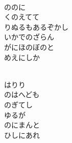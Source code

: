 \documentclass[10pt,b5j]{tarticle} %
\begin{document}
\begin{enumerate}
\begin{minipage}[c]{\blocksize}
        \vspace{\linespace}
        \item~\\
        ののに\\
        くのえてて\\
        りぬるもあるぞかし\\
        いかでのざらん\\
        がにほのぼのと\\
        めえにしか
        
        \vspace{\linespace}
        \item~\\
        はりり\\
        のはへども\\
        のぎてし\\
        ゆるが\\
        のにまんと\\
        ひしにあれ
    
    \end{minipage}
\end{enumerate} %
\end{document}

